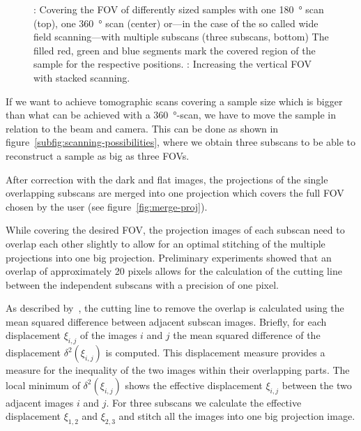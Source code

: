 \begin{figure*}
	\noindent{}%
	\caption[Covering the FOV of differently sized samples]{: Covering the FOV of differently sized samples with one \SI{180}{\degree} scan (top), one \SI{360}{\degree} scan (center) or---in the case of the so called wide field scanning---with multiple subscans (three subscans, bottom) The filled red, green and blue segments mark the covered region of the sample for the respective positions. : Increasing the vertical FOV with stacked scanning.
	}%
	\label{fig:scanning-possibilities}%
\end{figure*}

If we want to achieve tomographic scans covering a sample size which is bigger than what can be achieved with a \SI{360}{\degree}-scan, we have to move the sample in relation to the beam and camera. This can be done as shown in figure~\ref{subfig:scanning-possibilities}, where we obtain three subscans to be able to reconstruct a sample as big as three FOVs.

After correction with the dark and flat images, the projections of the single overlapping subscans are merged into one projection which covers the full FOV chosen by the user (see figure~\ref{fig:merge-proj}).

\cbstart
While covering the desired FOV, the projection images of each subscan need to overlap each other slightly to allow for an optimal stitching of the multiple projections into one big projection. Preliminary experiments  showed that an overlap of approximately 20 pixels allows for the calculation of the cutting line between the independent subscans with a precision of one pixel.
\cbend

As described by~\citet{Hintermueller2009}, the cutting line to remove the overlap is calculated using the mean squared difference between adjacent subscan images. Briefly, for each displacement $\xi_{i,j}$ of the images $i$ and $j$ the mean squared difference of the displacement $\delta^2(\xi_{i,j})$ is computed. This displacement measure provides a measure for the inequality of the two images within their overlapping parts. The local minimum of $\delta^2(\xi_{i,j})$ shows the effective displacement $\xi_{i,j}$ between the two adjacent images $i$ and $j$. For three subscans we calculate the effective displacement $\xi_{1,2}$ and $\xi_{2,3}$ and stitch all the images into one big projection image.

